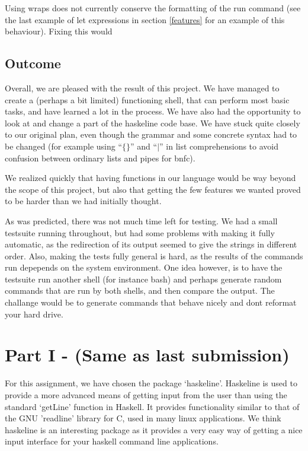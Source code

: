 \documentclass[11pt,a4paper]{article}
\begin{document}
Using wraps does not currently conserve the formatting of the run command (see the last example of let expressions in section \ref{features} for an example of this behaviour). Fixing this would

\subsection{Outcome}

Overall, we are pleased with the result of this project. We have managed to
create a (perhaps a bit limited) functioning shell, that can perform most basic
tasks, and have learned a lot in the process. We have also had the opportunity
to look at and change a part of the haskeline code base. We have stuck quite
closely to our original plan, even though the grammar and some concrete syntax
had to be changed (for example using ``$\{\}$'' and ``$|$'' in list comprehensions
to avoid confusion between ordinary lists and pipes for bnfc).

We realized quickly that having functions in our language would be way beyond
the scope of this project, but also that getting the few features we wanted
proved to be harder than we had initially thought.

As was predicted, there was not much time left for testing. We had a small
testsuite running throughout, but had some problems with making it fully
automatic, as the redirection of its output seemed to give the strings in
different order. Also, making the tests fully general is hard, as the results
of the commands run depepends on the system environment. One idea however, is
to have the testsuite run another shell (for instance bash) and perhaps
generate random commands that are run by both shells, and then compare the
output. The challange would be to generate commands that behave nicely and dont
reformat your hard drive.














\newpage
\appendix

\section{Part I - (Same as last submission)}
For this assignment, we have chosen the package ‘haskeline’. Haskeline is used
to provide a more advanced means of getting input from the user than using the
standard ‘getLine’ function in Haskell. It provides functionality similar to
that of the GNU 'readline' library for C, used in many linux applications. We
think haskeline is an interesting package as it provides a very easy way of
getting a nice input interface for your haskell command line applications.
\end{document}
